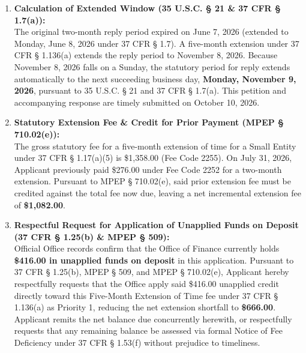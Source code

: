 \documentclass[11pt,letterpaper]{article}
\begin{document}
\begin{enumerate}[leftmargin=*]
    \item \textbf{Calculation of Extended Window (35 U.S.C. \S{} 21 \& 37 CFR \S{} 1.7(a)):} \\
    The original two-month reply period expired on June 7, 2026 (extended to Monday, June 8, 2026 under 37 CFR \S{} 1.7). A five-month extension under 37 CFR \S{} 1.136(a) extends the reply period to November 8, 2026. Because November 8, 2026 falls on a Sunday, the statutory period for reply extends automatically to the next succeeding business day, \textbf{Monday, November 9, 2026}, pursuant to 35 U.S.C. \S{} 21 and 37 CFR \S{} 1.7(a). This petition and accompanying response are timely submitted on October 10, 2026.

    \item \textbf{Statutory Extension Fee \& Credit for Prior Payment (MPEP \S{} 710.02(e)):} \\
    The gross statutory fee for a five-month extension of time for a Small Entity under 37 CFR \S{} 1.17(a)(5) is \$1,358.00 (Fee Code 2255). On July 31, 2026, Applicant previously paid \$276.00 under Fee Code 2252 for a two-month extension. Pursuant to MPEP \S{} 710.02(e), said prior extension fee must be credited against the total fee now due, leaving a net incremental extension fee of \textbf{\$1,082.00}.

    \item \textbf{Respectful Request for Application of Unapplied Funds on Deposit (37 CFR \S{} 1.25(b) \& MPEP \S{} 509):} \\
    Official Office records confirm that the Office of Finance currently holds \textbf{\$416.00 in unapplied funds on deposit} in this application. Pursuant to 37 CFR \S{} 1.25(b), MPEP \S{} 509, and MPEP \S{} 710.02(e), Applicant hereby respectfully requests that the Office apply said \$416.00 unapplied credit directly toward this Five-Month Extension of Time fee under 37 CFR \S{} 1.136(a) as Priority 1, reducing the net extension shortfall to \textbf{\$666.00}. Applicant remits the net balance due concurrently herewith, or respectfully requests that any remaining balance be assessed via formal Notice of Fee Deficiency under 37 CFR \S{} 1.53(f) without prejudice to timeliness.
\end{enumerate}
\end{document}
